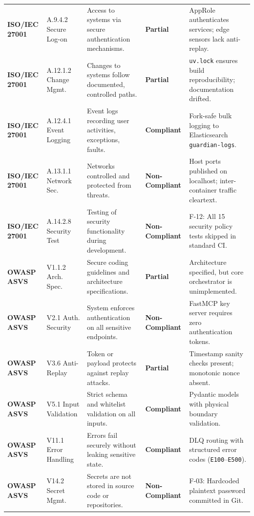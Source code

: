 \documentclass[10pt,a4paper]{report}
\begin{document}
\begin{center}
\begin{longtable}{llp{5.5cm}lp{4.2cm}}
\midrule
\textbf{ISO/IEC 27001} & A.9.4.2 Secure Log-on & Access to systems via secure authentication mechanisms. & \textbf{Partial} & AppRole authenticates services; edge sensors lack anti-replay. \\
\textbf{ISO/IEC 27001} & A.12.1.2 Change Mgmt. & Changes to systems follow documented, controlled paths. & \textbf{Partial} & \texttt{uv.lock} ensures build reproducibility; documentation drifted. \\
\textbf{ISO/IEC 27001} & A.12.4.1 Event Logging & Event logs recording user activities, exceptions, faults. & \textbf{Compliant} & Fork-safe bulk logging to Elasticsearch \texttt{guardian-logs}. \\
\textbf{ISO/IEC 27001} & A.13.1.1 Network Sec. & Networks controlled and protected from threats. & \textbf{Non-Compliant} & Host ports published on localhost; inter-container traffic cleartext. \\
\textbf{ISO/IEC 27001} & A.14.2.8 Security Test & Testing of security functionality during development. & \textbf{Non-Compliant} & F-12: All 15 security policy tests skipped in standard CI. \\
\midrule
\textbf{OWASP ASVS} & V1.1.2 Arch. Spec. & Secure coding guidelines and architecture specifications. & \textbf{Partial} & Architecture specified, but core orchestrator is unimplemented. \\
\textbf{OWASP ASVS} & V2.1 Auth. Security & System enforces authentication on all sensitive endpoints. & \textbf{Non-Compliant} & FastMCP key server requires zero authentication tokens. \\
\textbf{OWASP ASVS} & V3.6 Anti-Replay & Token or payload protects against replay attacks. & \textbf{Partial} & Timestamp sanity checks present; monotonic nonce absent. \\
\textbf{OWASP ASVS} & V5.1 Input Validation & Strict schema and whitelist validation on all inputs. & \textbf{Compliant} & Pydantic models with physical boundary validation. \\
\textbf{OWASP ASVS} & V11.1 Error Handling & Errors fail securely without leaking sensitive state. & \textbf{Compliant} & DLQ routing with structured error codes (\texttt{E100}--\texttt{E500}). \\
\textbf{OWASP ASVS} & V14.2 Secret Mgmt. & Secrets are not stored in source code or repositories. & \textbf{Non-Compliant} & F-03: Hardcoded plaintext password committed in Git. \\
\bottomrule
\end{longtable}
\end{center}
\end{document}
